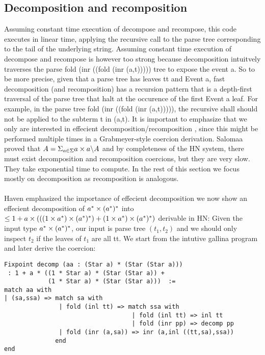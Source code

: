 \documentclass[a4paper,UKenglish,cleveref, autoref, thm-restate]{lipics-v2021}
\newcommand\mycomment[1]{}
\begin{document}
\subsection{Decomposition and recomposition}
Assuming constant time execution of \textsf{decompose} and \textsf{recompose}, this code executes in linear time, applying the recursive call to the parse tree corresponding to the tail of the underlying string. Assuming constant time execution of \textsf{decompose} and \textsf{recompose} is however too strong because decomposition intuitvely traverses the parse \textsf{fold (inr ((fold (inr (a,t)))))} tree to expose the event \textsf{a}. So to be more precise, given that a parse tree has leaves \textsf{tt} and \textsf{Event a}, fast decomposition (and recomposition) has a recursion pattern that is a depth-first traversal of the parse tree that halt at the occurence of the first \textsf{Event a} leaf. For example, in the parse tree \textsf{fold (inr ((fold (inr (a,t)))))}, the recursive shall should not be applied to the subterm \textsf{t} in \textsf{(a,t)}. It is important to emphasize that we only are interested in effecient decomposition/recomposition \mycomment{any aspects of recomposition that might differ from decomposition? Yes I think recomposition does not need fixpoints, which could be mentioned, also check code}, since this might be performed multiple times in a Grabmeyer-style coercion derivation. Salomaa proved that $A = \Sigma_{a \in \Sigma} a\times a \backslash A$ and by completeness of the HN system, there must exist decomposition and recomposition coercions, but they are very slow. They take exponential time to compute. In the rest of this section we focus mostly on decomposition as recomposition is analogous.\\\\
Haven emphasized the importance of effecient decomposition we now show an effecient decomposition of $a^*\times ({a^*})^*$ into $\leq 1 + a \times (((1 \times a^*) \times ({a^*})^*) + (1 \times a^*) \times ({a^*})^*)$ derivable in HN: Given the input type $a^*\times ({a^*})^*$, our input is parse tree $(t_1,t_2)$ and we should only inspect $t_2$ if the leaves of $t_1$ are all \textsf{tt}. We start from the intutive gallina program and later derive the coercion:\\
\begin{verbatim}
Fixpoint decomp (aa : (Star a) * (Star (Star a))) 
 : 1 + a * ((1 * Star a) * (Star (Star a)) + 
            (1 * Star a) * (Star (Star a)))  := 
match aa with 
| (sa,ssa) => match sa with 
               | fold (inl tt) => match ssa with 
                                   | fold (inl tt) => inl tt
                                   | fold (inr pp) => decomp pp
               | fold (inr (a,sa)) => inr (a,inl ((tt,sa),ssa))
              end
end
\end{verbatim}
\end{document}
